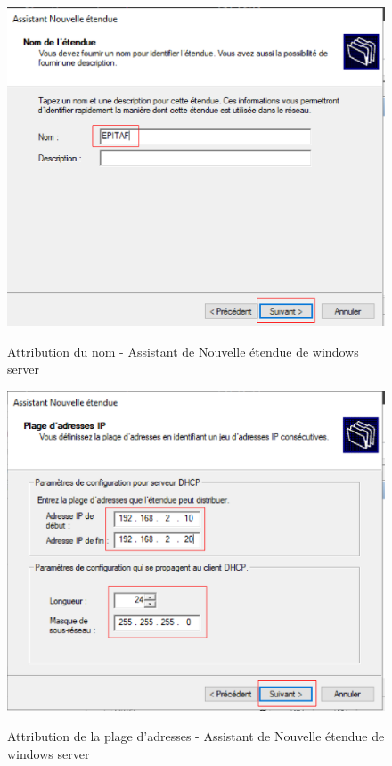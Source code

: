 \begin{figure}[h!]
	\begin{center}
		\caption{Attribution du nom - Assistant de Nouvelle étendue de windows server}
		\includegraphics[scale=0.7]{WS_Screenshots/39.png}
		\label{Funcs_WinS/11}
	\end{center}
\end{figure}
\FloatBarrier 
    

\begin{figure}[h!]
	\begin{center}
		\caption{Attribution de la plage d'adresses - Assistant de Nouvelle étendue de windows server}
		\includegraphics[scale=0.7]{WS_Screenshots/40.png}
		\label{Funcs_WinS/12}
	\end{center}
\end{figure}
\FloatBarrier 
    

